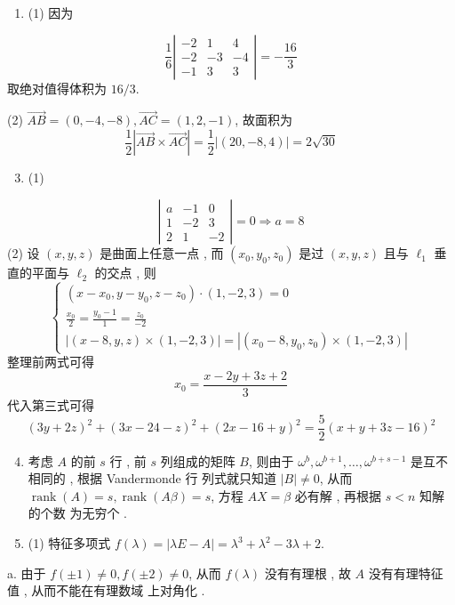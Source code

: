 \documentclass[10pt]{article}
\begin{document}
\begin{enumerate}
  \item (1)  因为 
\end{enumerate}
$$
\frac{1}{6}\left|\begin{array}{ccc}
-2 & 1 & 4 \\
-2 & -3 & -4 \\
-1 & 3 & 3
\end{array}\right|=-\frac{16}{3}
$$
 取绝对值得体积为  $16 / 3$.

(2) $\overrightarrow{A B}=(0,-4,-8), \overrightarrow{A C}=(1,2,-1)$,  故面积为 
$$
\frac{1}{2}|\overrightarrow{A B} \times \overrightarrow{A C}|=\frac{1}{2}|(20,-8,4)|=2 \sqrt{30}
$$

\begin{enumerate}
  \setcounter{enumi}{2}
  \item (1)
\end{enumerate}
$$
\left|\begin{array}{ccc}
a & -1 & 0 \\
1 & -2 & 3 \\
2 & 1 & -2
\end{array}\right|=0 \Longrightarrow a=8
$$
(2)  设  $(x, y, z)$  是曲面上任意一点 ,  而  $\left(x_{0}, y_{0}, z_{0}\right)$  是过  $(x, y, z)$  且与  $\ell_{1}$  垂直的平面与  $\ell_{2}$  的交点 ,  则 
$$
\left\{\begin{array}{c}
\left(x-x_{0}, y-y_{0}, z-z_{0}\right) \cdot(1,-2,3)=0 \\
\frac{x_{0}}{2}=\frac{y_{0}-1}{1}=\frac{z_{0}}{-2} \\
|(x-8, y, z) \times(1,-2,3)|=\left|\left(x_{0}-8, y_{0}, z_{0}\right) \times(1,-2,3)\right|
\end{array}\right.
$$
 整理前两式可得 
$$
x_{0}=\frac{x-2 y+3 z+2}{3}
$$
 代入第三式可得 
$$
(3 y+2 z)^{2}+(3 x-24-z)^{2}+(2 x-16+y)^{2}=\frac{5}{2}(x+y+3 z-16)^{2}
$$

\begin{enumerate}
  \setcounter{enumi}{3}
  \item  考虑  $A$  的前  $s$  行 ,  前  $s$  列组成的矩阵  $B$,  则由于  $\omega^{b}, \omega^{b+1}, \ldots, \omega^{b+s-1}$  是互不相同的 ,  根据  Vandermonde  行   列式就只知道  $|B| \neq 0$,  从而  $\operatorname{rank}(A)=s, \operatorname{rank}(A \beta)=s$,  方程  $A X=\beta$  必有解 ,  再根据  $s<n$  知解的个数   为无穷个 .

  \item (1)  特征多项式  $f(\lambda)=|\lambda E-A|=\lambda^{3}+\lambda^{2}-3 \lambda+2$.

\end{enumerate}
a.  由于  $f(\pm 1) \neq 0, f(\pm 2) \neq 0$,  从而  $f(\lambda)$  没有有理根 ,  故  $A$  没有有理特征值 ,  从而不能在有理数域   上对角化 .
\end{document}
